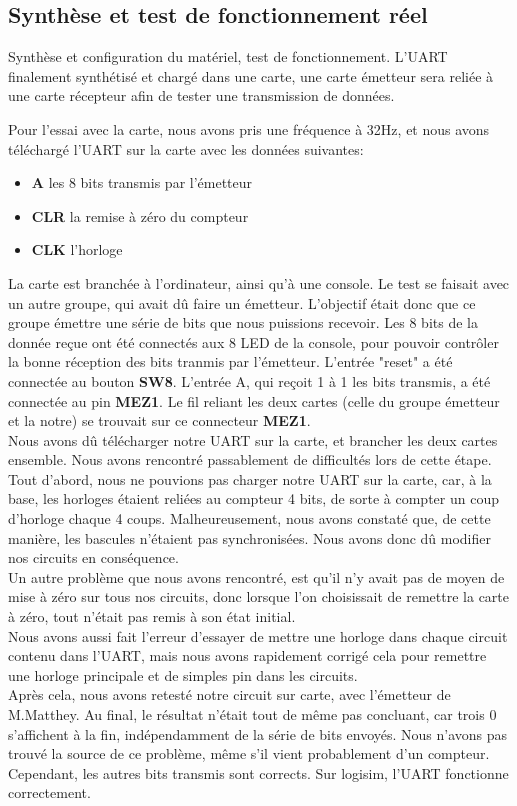 \documentclass[a4paper]{article} %
\begin{document}
 \subsection{Synthèse et test de fonctionnement réel}
Synthèse et configuration du matériel, test de fonctionnement.
L’UART finalement synthétisé et chargé dans une carte, une carte émetteur sera reliée à une carte récepteur afin de tester une transmission de données.
\begin{tcolorbox}[colframe=Monokaimagenta,colback=white]
Pour l'essai avec la carte, nous avons pris une fréquence à 32Hz, et nous avons téléchargé l'UART sur la carte avec les données suivantes:
\begin{itemize}
    \item     \textbf{A} les 8 bits transmis par l'émetteur
    \item     \textbf{CLR} la remise à zéro du compteur
    \item     \textbf{CLK} l'horloge
\end{itemize}

La carte est branchée à l'ordinateur, ainsi qu'à une console. Le test se faisait avec un autre groupe, qui avait dû faire un émetteur. L'objectif était donc que ce groupe émettre une série de bits que nous puissions recevoir.
Les 8 bits de la donnée reçue ont été connectés aux 8 LED de la console, pour pouvoir contrôler la bonne réception des bits tranmis par l'émetteur. L'entrée "reset" a été connectée au bouton \textbf{SW8}. L'entrée A, qui reçoit 1 à 1 les bits transmis, a été connectée au pin \textbf{MEZ1}. Le fil reliant les deux cartes (celle du groupe émetteur et la notre) se trouvait sur ce connecteur \textbf{MEZ1}.\\
Nous avons dû télécharger notre UART sur la carte, et brancher les deux cartes ensemble.
Nous avons rencontré passablement de difficultés lors de cette étape. Tout d'abord, nous ne pouvions pas charger notre UART sur la carte, car, à la base, les horloges étaient reliées au compteur 4 bits, de sorte à compter un coup d'horloge chaque 4 coups. Malheureusement, nous avons constaté que, de cette manière, les bascules n'étaient pas synchronisées. Nous avons donc dû modifier nos circuits en conséquence.\\
Un autre problème que nous avons rencontré, est qu'il n'y avait pas de moyen de mise à zéro sur tous nos circuits, donc lorsque l'on choisissait de remettre la carte à zéro, tout n'était pas remis à son état initial.\\
Nous avons aussi fait l'erreur d'essayer de mettre une horloge dans chaque circuit contenu dans l'UART, mais nous avons rapidement corrigé cela pour remettre une horloge principale et de simples pin dans les circuits.\\
Après cela, nous avons retesté notre circuit sur carte, avec l'émetteur de M.Matthey. Au final, le résultat n'était tout de même pas concluant, car trois $0$ s'affichent à la fin, indépendamment de la série de bits envoyés. Nous n'avons pas trouvé la source de ce problème, même s'il vient probablement d'un compteur. Cependant, les autres bits transmis sont corrects. Sur logisim, l'UART fonctionne correctement.

\end{tcolorbox}
\end{document}
